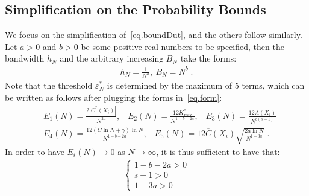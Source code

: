 \documentclass[a4paper,11pt]{article}
\theoremstyle{definition}
\begin{document}
\subsection{Simplification on the Probability Bounds}
We focus on the simplification of~\eqref{eq.boundDut}, and the others follow similarly. Let $a>0$ and $b>0$  be some positive real numbers to be specified, then the bandwidth $h_N$ and the arbitrary increasing $B_N$ take the forms:
\begin{align}
h_N = \frac{1}{N^a},~B_N = N^b\;.	\label{eq.form}
\end{align}
Note that the threshold $\varepsilon^*_N$ is determined by the maximum of 5 terms, which can be written as follows after plugging the forms in~\eqref{eq.form}:
\begin{align}
&E_1(N) = \frac{2|C^*(X_i)|}{N^{2a}}, \;\;\;
E_2(N) = \frac{12K_{\max}^*}{N^{1-b-2a}}, \;\;\;
E_3(N) = \frac{12A(X_i)}{N^{b(s-1)}}	\nonumber\\
&E_4(N) =\frac{12(C\ln N+\gamma)\ln N}{N^{1-b-2a}},  \;\;\;
E_5(N) = 12\overline{C}(X_i)\sqrt{\frac{2a\ln N}{N^{1-3a}}}\;.\label{eq.gamma}
\end{align}
In order to have $E_i(N)\to 0$ as $N\to\infty$, it is thus sufficient to have that:
\begin{align*}
\begin{cases}
	1-b-2a>0\\
s-1>0\\
	1-3a>0
\end{cases}	
\end{align*}
\end{document}
